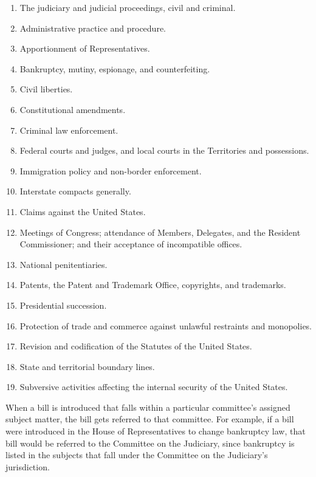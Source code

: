 \begin{enumerate}
\item The judiciary and judicial proceedings, civil and criminal. 
\item Administrative practice and procedure. 
\item Apportionment of Representatives. 
\item Bankruptcy, mutiny, espionage, and counterfeiting. 
\item Civil liberties. 
\item Constitutional amendments. 
\item Criminal law enforcement. 
\item Federal courts and judges, and local courts in the Territories and possessions. 
\item Immigration policy and non-border enforcement. 
\item Interstate compacts generally. 
\item Claims against the United States. 
\item Meetings of Congress; attendance of Members, Delegates, and the Resident Commissioner; and their acceptance of incompatible offices. 
\item National penitentiaries. 
\item Patents, the Patent and Trademark Office, copyrights, and trademarks. 
\item Presidential succession. 
\item Protection of trade and commerce against unlawful restraints and monopolies. 
\item Revision and codification of the Statutes of the United States. 
\item State and territorial boundary lines. 
\item Subversive activities affecting the internal security of the United States.
\end{enumerate}

When a bill is introduced that falls within a particular committee's assigned subject matter, the bill gets referred to that committee.
For example, if a bill were introduced in the House of Representatives to change bankruptcy law, that bill would be referred to the Committee on the Judiciary, since bankruptcy is listed in the subjects that fall under the Committee on the Judiciary's jurisdiction.

